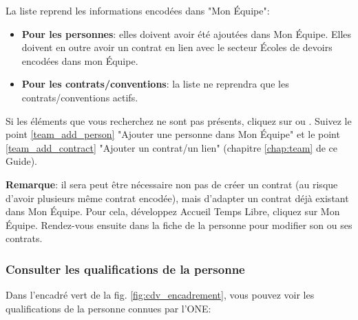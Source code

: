 \vspace*{4mm}
\begin{tcolorbox}[title=La personne ou le contrat/convention de celle-ci n'apparaît pas dans la liste]
La liste reprend les informations encodées dans "Mon Équipe":
\begin{itemize}
    \item \textbf{Pour les personnes}: elles doivent avoir été ajoutées dans Mon Équipe. Elles doivent en outre avoir un contrat en lien avec le secteur Écoles de devoirs encodées dans mon Équipe.
    \item \textbf{Pour les contrats/conventions}: la liste ne reprendra que les contrats/conventions actifs.
\end{itemize}

Si les éléments que vous recherchez ne sont pas présents, cliquez sur  ou . Suivez le point \ref{team_add_person} "Ajouter une personne dans Mon Équipe" et le point \ref{team_add_contract} "Ajouter un contrat/un lien" (chapitre \ref{chap:team} de ce Guide). 

\textbf{Remarque}: il sera peut être nécessaire non pas de créer un contrat (au risque d'avoir plusieurs même contrat encodée), mais d'adapter un contrat déjà existant dans Mon Équipe. Pour cela, développez Accueil Temps Libre, cliquez sur Mon Équipe. Rendez-vous ensuite dans la fiche de la personne pour modifier son ou ses contrats.  

\end{tcolorbox}

\subsubsection{Consulter les qualifications de la personne}

Dans l'encadré \textcolor{vert}{vert} de la fig. \ref{fig:cdv_encadrement}, vous pouvez voir les qualifications de la personne connues par l'ONE:

